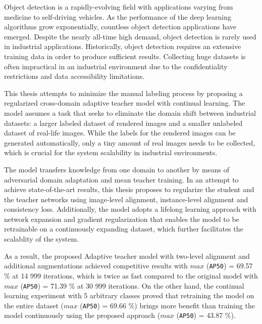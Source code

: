 \documentclass[english, 12pt, a4paper, elec, utf8, a-1b, online]{aaltothesis}
\begin{document}
\begin{abstractpage}[english]

Object detection is a rapidly-evolving field with applications varying from medicine to self-driving vehicles. As the performance of the deep learning algorithms grow exponentially, countless object detection applications have emerged. Despite the nearly all-time high demand, object detection is rarely used in industrial applications. Historically, object detection requires an extensive training data in order to produce sufficient results. Collecting huge datasets is often impractical in an  industrial environment due to the confidentiality restrictions and data accessibility limitations. 

This thesis attempts to minimize the manual labeling process by proposing a regularized cross-domain adaptive teacher model with continual learning. The model assumes a task that seeks to eliminate the domain shift between industrial datasets: a larger labeled dataset of rendered images and a smaller unlabeled dataset of real-life images. While the labels for the rendered images can be generated automatically, only a tiny amount of real images needs to be collected, which is crucial for the system scalability in industrial environments.  

The model transfers knowledge from one domain to another by means of adversarial domain adaptation and mean teacher training. In an attempt to achieve state-of-the-art results, this thesis proposes to regularize the student and the teacher networks using image-level alignment, instance-level alignment and consistency loss. Additionally, the model adopts a lifelong learning approach with network expansion and gradient regularization that enables the model to be retrainable on a continuously expanding dataset, which further facilitates the scalablity of the system.

As a result, the proposed  Adaptive teacher model with two-level alignment and additional augmentations achieved competitive results with $max$ (\texttt{AP50}) = 69.57 \% at 14 999 iterations, which is twice as fast compared to the original model with $max$ (\texttt{AP50}) = 71.39 \% at 30 999 iterations. On the other hand, the continual learning experiment with 5 arbitrary classes proved that retraining the model on the entire dataset ($max$ (\texttt{AP50}) = 69.66 \%) brings more benefit than training the model continuously using the proposed approach ($max$ (\texttt{AP50}) = 43.87 \%).

 
\end{abstractpage}
\end{document}
